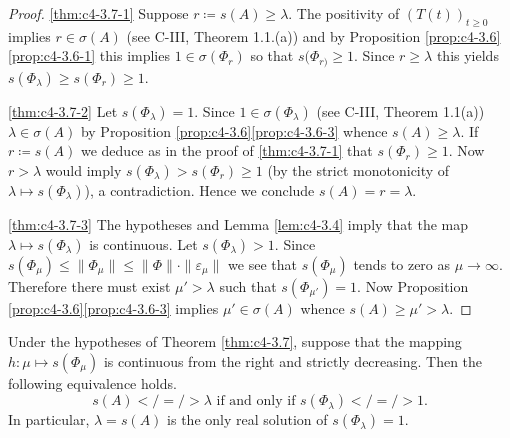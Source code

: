 \begin{proof}
\ref{thm:c4-3.7-1} Suppose $r \coloneqq s(A) \geq \lambda$. 
The positivity of $(T(t))_{t \geq 0}$ implies $r \in \sigma(A)$ (see C-III, Theorem 1.1.(a)) and by Proposition \ref{prop:c4-3.6}\ref{prop:c4-3.6-1}  this implies $1 \in \sigma(\Phi_r)$ so that $s(\Phi_{r)} \geq 1$. 
Since $r \geq \lambda$ this yields $s(\Phi_{\lambda}) \geq s(\Phi_{r}) \geq 1$.

\ref{thm:c4-3.7-2} Let $s(\Phi_{\lambda}) = 1$. 
Since $1 \in \sigma(\Phi_{\lambda})$ (see C-III, Theorem 1.1(a)) $\lambda \in \sigma(A)$ by Proposition \ref{prop:c4-3.6}\ref{prop:c4-3.6-3} whence $s(A) \geq \lambda$. 
If $r \coloneqq s(A)$ we deduce as in the proof of \ref{thm:c4-3.7-1} that $s(\Phi_{r}) \geq 1$. 
Now $r > \lambda$ would imply $s(\Phi_{\lambda}) > s(\Phi_{r}) \geq 1$ (by the strict monotonicity of $\lambda \mapsto s(\Phi_{\lambda})$), a contradiction. Hence we conclude $s(A) = r = \lambda$.

\ref{thm:c4-3.7-3} The hypotheses and Lemma \ref{lem:c4-3.4} imply that the map $\lambda \mapsto s(\Phi_{\lambda})$ is continuous. Let $s(\Phi_{\lambda}) > 1$. 
Since $s(\Phi_{\mu}) \leq \|\Phi_{\mu}\| \leq \|\Phi\| \cdot \|\varepsilon_{\mu}\|$ we see that $s(\Phi_{\mu})$ tends to zero as $\mu \to \infty$. 
Therefore there must exist $\mu' > \lambda$ such that $s(\Phi_{\mu'}) = 1$. Now Proposition \ref{prop:c4-3.6}\ref{prop:c4-3.6-3}  implies $\mu' \in \sigma(A)$ whence $s(A) \geq \mu' > \lambda$.
\end{proof}

\begin{corollary}\label{cor:c4-3.8}
Under the hypotheses of Theorem \ref{thm:c4-3.7}, suppose that the mapping $h: \mu \mapsto s(\Phi_{\mu})$ is continuous from the right and strictly decreasing. Then the following equivalence holds.
\begin{equation}\label{eq:c4-3.9}
s(A) < / = / > \lambda \text{ if and only if } s(\Phi_{\lambda}) < / = / >1.
\end{equation}
In particular, $\lambda = s(A)$ is the only real solution of $s(\Phi_{\lambda}) = 1$.
\end{corollary}


